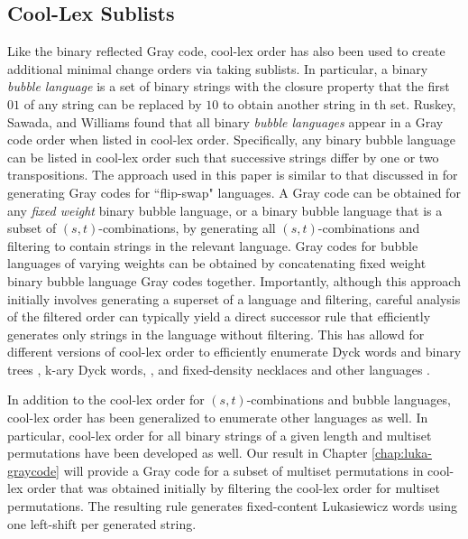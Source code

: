 



\subsection{Cool-Lex Sublists}

Like the binary reflected Gray code, cool-lex order has also been used to create additional minimal change orders via taking sublists. In particular, a binary \emph{bubble language} is a set of binary strings with the closure property that the first $01$ of any string can be replaced by $10$ to obtain another string in th set.  Ruskey, Sawada, and Williams found that all binary \emph{bubble languages} appear in a Gray code order when listed in cool-lex order.  Specifically, any binary bubble language can be listed in cool-lex order such that successive strings differ by one or two transpositions.  The approach used in this paper is similar to that discussed in \cite{sawada2021inside} for generating Gray codes for ``flip-swap" languages.  A Gray code can be obtained for any \emph{fixed weight} binary bubble language, or a binary bubble language that is a subset of $(s,t)$-combinations, by generating all $(s,t)$-combinations and filtering to contain strings in the relevant language.  Gray codes for bubble languages of varying weights can be obtained by concatenating fixed weight binary bubble language Gray codes together.
Importantly, although this approach initially involves generating a superset of a language and filtering, careful analysis of the filtered order can typically yield a direct successor rule that efficiently generates only strings in the language without filtering.  This has allowd for different versions of cool-lex order to efficiently enumerate Dyck words and binary trees \cite{ruskey2008generating}, k-ary Dyck words, \cite{durocher2012cool}, and fixed-density necklaces and other languages \cite{sawada2009fixed}.  

In addition to the cool-lex order for $(s,t)$-combinations and bubble languages, cool-lex order has been generalized to enumerate other languages as well.  In particular, cool-lex order for all binary strings of a given length \cite{stevens2012coolest} and multiset permutations \cite{williams2009loopless} have been developed as well.  Our result in Chapter \ref{chap:luka-graycode} will provide a Gray code for a subset of multiset permutations in cool-lex order that was obtained initially by filtering the cool-lex order for multiset permutations.  The resulting rule generates fixed-content Lukasiewicz words using one left-shift per generated string.


